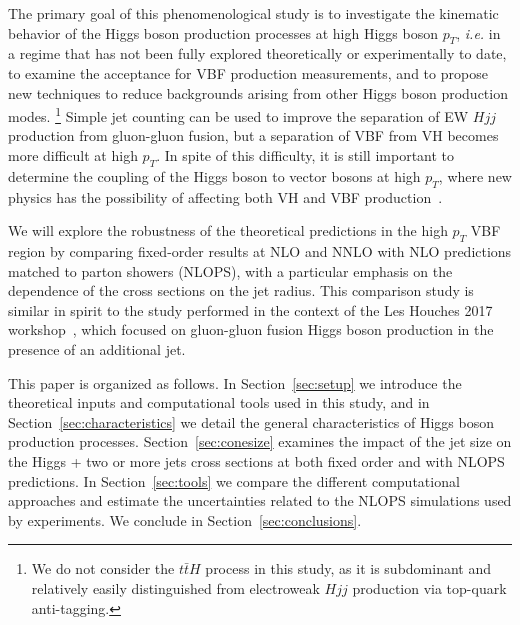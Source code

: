 \documentclass[10pt,prd,fleqn,superscriptaddress,notitlepage,nofootinbib,preprintnumbers,nobalancelastpage]{revtex4-1}
\newcommand{\VBF}{VBF\xspace}
\newcommand{\VH}{VH\xspace}
\begin{document}
The primary goal of this phenomenological study is to investigate the kinematic behavior of the Higgs boson production processes at high Higgs boson $p_T$, \emph{i.e.} in  a regime that has not been fully explored theoretically or experimentally to date, to examine the acceptance for  \VBF production measurements, and to propose new techniques to reduce backgrounds arising from other Higgs boson production modes.%
\footnote{We do not consider the $t\bar{t}H$ process in this study, as it is subdominant and relatively easily distinguished from electroweak $Hjj$ production via top-quark anti-tagging.} Simple jet counting can be used to improve the separation of  EW $Hjj$ production from gluon-gluon fusion, but a separation of \VBF from \VH becomes more difficult at high $p_T$.
In spite of this difficulty, it is still important to determine the coupling of the Higgs boson to vector bosons at high $p_T$, where new physics has the possibility of affecting both \VH and \VBF production~\cite{Araz:2020zyh}.

We will explore the robustness of the theoretical predictions in the high $p_T$ VBF region by comparing fixed-order results at NLO and NNLO with NLO predictions matched to parton showers (NLOPS), with a particular emphasis on the dependence of the cross sections on the jet radius. This comparison study is similar in spirit to the study performed in the context of the Les Houches 2017 workshop~\cite{Bellm:2019yyh}, which focused on gluon-gluon fusion Higgs boson production in the presence of an additional jet.

This paper is organized as follows. In Section~\ref{sec:setup} we introduce the theoretical inputs and computational tools used in this study, and in Section~\ref{sec:characteristics} we detail the general characteristics of Higgs boson production processes. Section~\ref{sec:conesize} examines the impact of the jet size on the Higgs + two or more jets cross sections at both fixed order and with NLOPS predictions. In Section~\ref{sec:tools} we compare the different computational approaches and estimate the uncertainties related to the NLOPS simulations used by experiments. We conclude in Section~\ref{sec:conclusions}.
\end{document}
